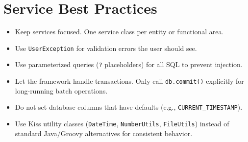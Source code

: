 \section{Service Best Practices}
\label{sec:svc-bestpractices}

\begin{itemize}
  \item Keep services focused.  One service class per entity or functional area.
  \item Use \texttt{UserException} for validation errors the user should see.
  \item Use parameterized queries (\texttt{?} placeholders) for all SQL to prevent injection.
  \item Let the framework handle transactions.  Only call \texttt{db.commit()} explicitly for long-running batch operations.
  \item Do not set database columns that have defaults (e.g., \texttt{CURRENT\_TIMESTAMP}).
  \item Use Kiss utility classes (\texttt{DateTime}, \texttt{NumberUtils}, \texttt{FileUtils}) instead of standard Java/Groovy alternatives for consistent behavior.
\end{itemize}
